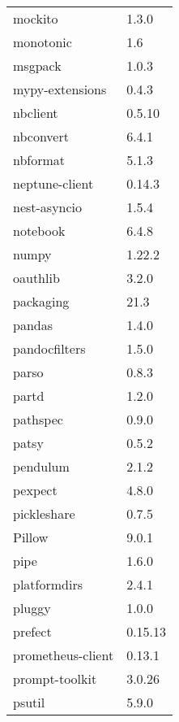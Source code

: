 \begin{table}[h]
\begin{tabular}{|l|l|}
    mockito                      & 1.3.0     \\
    monotonic                    & 1.6       \\
    msgpack                      & 1.0.3     \\
    mypy-extensions              & 0.4.3     \\
    nbclient                     & 0.5.10    \\
    nbconvert                    & 6.4.1     \\
    nbformat                     & 5.1.3     \\
    neptune-client               & 0.14.3    \\
    nest-asyncio                 & 1.5.4     \\
    notebook                     & 6.4.8     \\
    numpy                        & 1.22.2    \\
    oauthlib                     & 3.2.0     \\
    packaging                    & 21.3      \\
    pandas                       & 1.4.0     \\
    pandocfilters                & 1.5.0     \\
    parso                        & 0.8.3     \\
    partd                        & 1.2.0     \\
    pathspec                     & 0.9.0     \\
    patsy                        & 0.5.2     \\
    pendulum                     & 2.1.2     \\
    pexpect                      & 4.8.0     \\
    pickleshare                  & 0.7.5     \\
    Pillow                       & 9.0.1     \\
    pipe                         & 1.6.0     \\
    platformdirs                 & 2.4.1     \\
    pluggy                       & 1.0.0     \\
    prefect                      & 0.15.13   \\
    prometheus-client            & 0.13.1    \\
    prompt-toolkit               & 3.0.26    \\
    psutil                       & 5.9.0     \\

\end{tabular}
\end{table}
